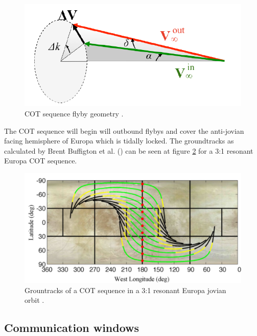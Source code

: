\begin{figure}[htb!]
\centering
\includegraphics[scale=0.6]{figures/Orbiter/flbeom.png}
\caption{COT sequence flyby geometry \cite{cotseq}.}
\label{fig:cotgeo}
\end{figure}

The COT sequence will begin will outbound flybys and cover the anti-jovian facing hemisphere of Europa which is tidally locked. The groundtracks as calculated by Brent Buffigton et al. (\cite{cotseq}) can be seen at figure \ref{fig:ground_tr} for a 3:1 resonant Europa COT sequence.

\begin{figure}[htb!]
\centering
\includegraphics[width=\textwidth]{figures/Orbiter/groundtr.png}
\caption{Grountracks of a COT sequence in a 3:1 resonant Europa jovian orbit \cite{cotseq}.}
\label{fig:ground_tr}
\end{figure}

\subsection{Communication windows}
